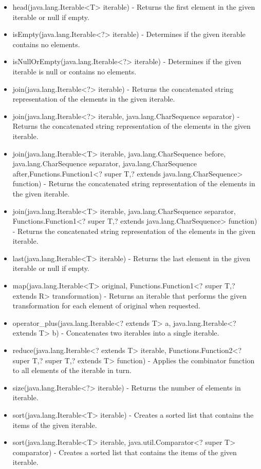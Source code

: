 \begin{itemize}
	\item head(java.lang.Iterable<T> iterable) - Returns the first element in the given iterable or null if empty.
	\item isEmpty(java.lang.Iterable<?> iterable) - Determines if the given iterable contains no elements.
	\item isNullOrEmpty(java.lang.Iterable<?> iterable) - Determines if the given iterable is null or contains no elements.
	\item join(java.lang.Iterable<?> iterable) - Returns the concatenated string representation of the elements in the given iterable.
	\item join(java.lang.Iterable<?> iterable, java.lang.CharSequence separator) - Returns the concatenated string representation of the elements in the given iterable.
	\item join(java.lang.Iterable<T> iterable, java.lang.CharSequence before, java.lang.CharSequence separator, java.lang.CharSequence after,Functions.Function1<? super T,? extends java.lang.CharSequence> function) - Returns the concatenated string representation of the elements in the given iterable.
	\item join(java.lang.Iterable<T> iterable, java.lang.CharSequence separator, Functions.Function1<? super T,? extends java.lang.CharSequence> function) - Returns the concatenated string representation of the elements in the given iterable.
	\item last(java.lang.Iterable<T> iterable) - Returns the last element in the given iterable or null if empty.
	\item map(java.lang.Iterable<T> original, Functions.Function1<? super T,? extends R> transformation) - Returns an iterable that performs the given transformation for each element of original when requested.
	\item operator\_plus(java.lang.Iterable<? extends T> a, java.lang.Iterable<? extends T> b) - Concatenates two iterables into a single iterable.
	\item reduce(java.lang.Iterable<? extends T> iterable, Functions.Function2<? super T,? super T,? extends T> function) - Applies the combinator function to all elements of the iterable in turn.
	\item size(java.lang.Iterable<?> iterable) - Returns the number of elements in iterable.
	\item sort(java.lang.Iterable<T> iterable) - Creates a sorted list that contains the items of the given iterable.
	\item sort(java.lang.Iterable<T> iterable, java.util.Comparator<? super T> comparator) - Creates a sorted list that contains the items of the given iterable.

\end{itemize}
